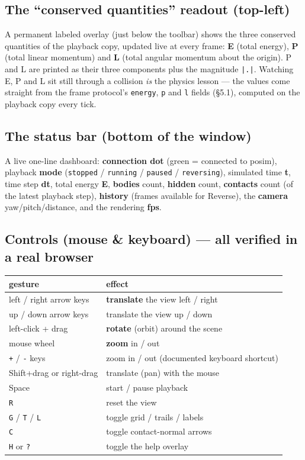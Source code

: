 \documentclass[11pt]{article}
\newcommand{\code}[1]{\texttt{#1}}
\begin{document}
\subsection{The ``conserved quantities'' readout (top-left)}

A permanent labeled overlay (just below the toolbar) shows the three
conserved quantities of the playback copy, updated live at every
frame: \textbf{E} (total energy), \textbf{P} (total linear momentum)
and \textbf{L} (total angular momentum about the origin). P and L are
printed as their three components plus the magnitude \code{|.|}.
Watching E, P and L sit still through a collision \emph{is} the
physics lesson --- the values come straight from the frame protocol's
\code{energy}, \code{p} and \code{l} fields (\S5.1), computed on the
playback copy every tick.

\subsection{The status bar (bottom of the window)}

A live one-line dashboard: \textbf{connection dot} (green = connected
to posim), playback \textbf{mode} (\code{stopped} / \code{running} /
\code{paused} / \code{reversing}), simulated time \textbf{t}, time
step \textbf{dt}, total energy \textbf{E}, \textbf{bodies} count,
\textbf{hidden} count, \textbf{contacts} count (of the latest playback
step), \textbf{history} (frames available for
Reverse), the \textbf{camera} yaw/pitch/distance, and the rendering
\textbf{fps}.

\subsection{Controls (mouse \& keyboard) --- all verified in a real
browser}

\begin{center}
\begin{tabular}{lp{8.6cm}}
\textbf{gesture} & \textbf{effect}\\\hline
left / right arrow keys & \textbf{translate} the view left / right\\
up / down arrow keys & translate the view up / down\\
left-click + drag & \textbf{rotate} (orbit) around the scene\\
mouse wheel & \textbf{zoom} in / out\\
\code{+} / \code{-} keys & zoom in / out (documented keyboard shortcut)\\
Shift+drag or right-drag & translate (pan) with the mouse\\
Space & start / pause playback\\
\code{R} & reset the view\\
\code{G} / \code{T} / \code{L} & toggle grid / trails / labels\\
\code{C} & toggle contact-normal arrows\\
\code{H} or \code{?} & toggle the help overlay\\
\end{tabular}
\end{center}
\end{document}
